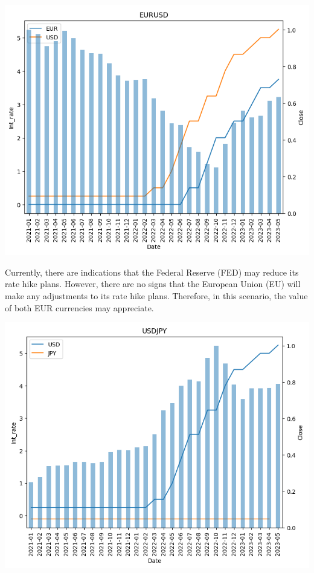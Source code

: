 \documentclass{article}
\begin{document}
\begin{center}
    \includegraphics[scale=0.8]{p13.png}    
\end{center}

Currently, there are indications that the Federal Reserve (FED) may reduce its rate hike plans. However, there are no signs that the European Union (EU) will make any adjustments to its rate hike plans. Therefore, in this scenario, the value of both EUR currencies may appreciate.

\begin{center}
    \includegraphics[scale=0.8]{p14.png}    
\end{center}
\end{document}

